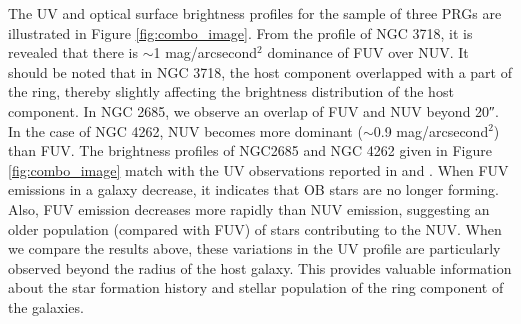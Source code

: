 \documentclass{pas}
\begin{document}
The UV and optical surface brightness profiles for the sample of three PRGs are illustrated in Figure \ref{fig:combo_image}. From the profile of NGC 3718, it is revealed that there is $\sim$1 mag/arcsecond$^{2}$  dominance of FUV over NUV. It should be noted that in NGC 3718, the host component overlapped with a part of the ring, thereby slightly affecting the brightness distribution of the host component. In NGC 2685, we observe an overlap of FUV and NUV beyond \ang{;;20}. In the case of NGC 4262, NUV becomes more dominant ($\sim$0.9 mag/arcsecond$^{2}$) than FUV. The brightness profiles of NGC2685 and NGC 4262 given in Figure \ref{fig:combo_image} match with the UV observations reported in \citet{2017Rampazzo} and \cite{2018Bouquin}. When FUV emissions in a galaxy decrease, it indicates that OB stars are no longer forming. Also, FUV emission decreases more rapidly than NUV emission, suggesting an older population (compared with FUV) of stars contributing to the NUV. When we compare the results above, these variations in the UV profile are particularly observed beyond the radius of the host galaxy. This provides valuable information about the star formation history and stellar population of the ring component of the galaxies. 

\begin{table}
    \centering
    \caption{Filters and their wavelengths used in the SED fitting}
    \label{tab:filters}
\end{table}
\end{document}
